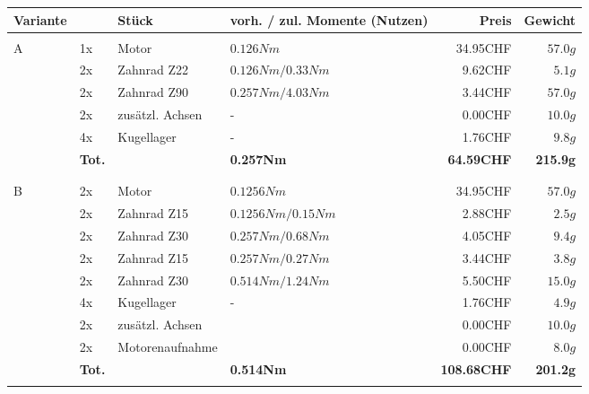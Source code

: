     \begin{longtable}{p{0.5cm}p{0.8cm}lp{3cm}rr}
        \textbf{Variante}& & \textbf{Stück} & \textbf{vorh. / zul. Momente (Nutzen)} & \textbf{Preis} & \textbf{Gewicht} \\\hline
          &       &                 &                      &          &  \\
        \multirow{6}[2]{*}{A}
          & 1x    & Motor           & $0.126 Nm$           & 34.95CHF & $57.0 g$ \\
          & 2x    & Zahnrad Z22     & $0.126 Nm / 0.33 Nm$ &  9.62CHF & $5.1 g$  \\
          & 2x    & Zahnrad Z90     & $0.257 Nm / 4.03 Nm$ &  3.44CHF & $57.0 g$ \\
          & 2x    & zusätzl. Achsen & -                    &  0.00CHF & $10.0 g$ \\
          & 4x    & Kugellager      & -                    &  1.76CHF & $9.8 g$  \\
          & \textbf{Tot.} &  & \textbf{0.257Nm} & \textbf{64.59CHF} & \textbf{215.9g} \\
          &       &                 &                      &          &  \\
          &       &                 &                      &          &  \\
        \multirow{8}[2]{*}{B}
          & 2x    & Motor           & $0.1256 Nm$          & 34.95CHF & $57.0 g$ \\
          & 2x    & Zahnrad Z15     & $0.1256 Nm / 0.15 Nm$& 2.88CHF  & $2.5 g$  \\
          & 2x    & Zahnrad Z30     & $0.257 Nm / 0.68 Nm$ & 4.05CHF  & $9.4 g$  \\
          & 2x    & Zahnrad Z15     & $0.257 Nm / 0.27 Nm$ & 3.44CHF  & $3.8 g$  \\
          & 2x    & Zahnrad Z30     & $0.514 Nm / 1.24 Nm$ & 5.50CHF  & $15.0 g$ \\
          & 4x    & Kugellager      & -                    & 1.76CHF  & $4.9 g$  \\
          & 2x    & zusätzl. Achsen &                      & 0.00CHF  & $10.0 g$ \\
          & 2x    & Motorenaufnahme &                      & 0.00CHF  & $8.0 g$  \\
          & \textbf{Tot.} &       & \textbf{0.514Nm} & \textbf{108.68CHF} & \textbf{201.2g} \\
          &       &                 &                      &          &  \\

\end{longtable}
